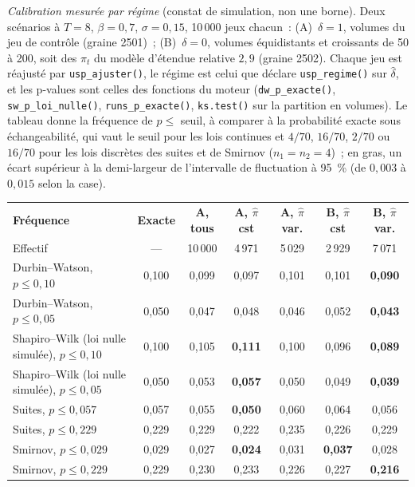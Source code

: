 \documentclass[a4paper,11pt]{article}
\newcommand{\code}[1]{\texttt{\small #1}}
\begin{document}
\emph{Calibration mesurée par régime} (constat de simulation, non une borne). Deux scénarios à
$T = 8$, $\beta = 0{,}7$, $\sigma = 0{,}15$, 10\,000 jeux chacun~: (A)~$\delta = 1$, volumes du jeu
de contrôle (graine 2501)~; (B)~$\delta = 0$, volumes équidistants et croissants de 50 à 200, soit
des $\pi_t$ du modèle d'étendue relative $2{,}9$ (graine 2502). Chaque jeu est réajusté par
\code{usp\_ajuster()}, le régime est celui que déclare \code{usp\_regime()} sur $\hat\delta$, et les
p-values sont celles des fonctions du moteur (\code{dw\_p\_exacte()}, \code{sw\_p\_loi\_nulle()},
\code{runs\_p\_exacte()}, \code{ks.test()} sur la partition en volumes). Le tableau donne la
fréquence de $p \le$ seuil, à comparer à la probabilité exacte sous échangeabilité, qui vaut le
seuil pour les lois continues et $4/70$, $16/70$, $2/70$ ou $16/70$ pour les lois discrètes des
suites et de Smirnov ($n_1 = n_2 = 4$)~; en gras, un écart supérieur à la demi-largeur de
l'intervalle de fluctuation à 95~\% (de $0{,}003$ à $0{,}015$ selon la case).

\begin{center}
\small
{}
\begin{tabular}{@{}p{5.0cm}cccccc@{}}
\rowcolor{tableheader}
\textcolor{financeblue}{\textbf{Fréquence}} &
\textcolor{financeblue}{\textbf{Exacte}} &
\textcolor{financeblue}{\textbf{A, tous}} &
\textcolor{financeblue}{\textbf{A, $\hat\pi$ cst}} &
\textcolor{financeblue}{\textbf{A, $\hat\pi$ var.}} &
\textcolor{financeblue}{\textbf{B, $\hat\pi$ cst}} &
\textcolor{financeblue}{\textbf{B, $\hat\pi$ var.}} \\
Effectif & --- & 10\,000 & 4\,971 & 5\,029 & 2\,929 & 7\,071 \\
Durbin--Watson, $p \le 0{,}10$ & 0{,}100 & 0{,}099 & 0{,}097 & 0{,}101 & 0{,}101 & \textbf{0{,}090} \\
Durbin--Watson, $p \le 0{,}05$ & 0{,}050 & 0{,}047 & 0{,}048 & 0{,}046 & 0{,}052 & \textbf{0{,}043} \\
Shapiro--Wilk (loi nulle simulée), $p \le 0{,}10$ & 0{,}100 & 0{,}105 & \textbf{0{,}111} & 0{,}100 & 0{,}096 & \textbf{0{,}089} \\
Shapiro--Wilk (loi nulle simulée), $p \le 0{,}05$ & 0{,}050 & 0{,}053 & \textbf{0{,}057} & 0{,}050 & 0{,}049 & \textbf{0{,}039} \\
Suites, $p \le 0{,}057$ & 0{,}057 & 0{,}055 & \textbf{0{,}050} & 0{,}060 & 0{,}064 & 0{,}056 \\
Suites, $p \le 0{,}229$ & 0{,}229 & 0{,}229 & 0{,}222 & 0{,}235 & 0{,}226 & 0{,}229 \\
Smirnov, $p \le 0{,}029$ & 0{,}029 & 0{,}027 & \textbf{0{,}024} & 0{,}031 & \textbf{0{,}037} & 0{,}028 \\
Smirnov, $p \le 0{,}229$ & 0{,}229 & 0{,}230 & 0{,}233 & 0{,}226 & 0{,}227 & \textbf{0{,}216} \\
\end{tabular}
\end{center}
\end{document}
